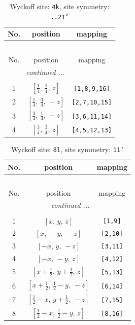 \documentclass[fleqn,8pt]{jsarticle}
\begin{document}
\renewcommand{\arraystretch}{1.2}
\begin{longtable}{ccc}
\caption{Wyckoff site: {\tt 4k}, site symmetry: {\tt ..21'}}
 \\
 \hline \hline
No. & position & mapping \\ \hline \endfirsthead

\multicolumn{2}{l}{\tablename\ \thetable{}} \\
 \hline \hline
No. & position & mapping \\ \hline \endhead

 \hline \hline
\multicolumn{2}{r}{\footnotesize\it continued ...} \\ \endfoot

 \hline \hline
\multicolumn{2}{r}{} \\ \endlastfoot

1 & $\left[ \frac{1}{4},\, \frac{1}{4},\, z \right]$ & {\tt [1,8,9,16]} \\ \hline
2 & $\left[ \frac{1}{4},\, \frac{3}{4},\, - z \right]$ & {\tt [2,7,10,15]} \\ \hline
3 & $\left[ \frac{3}{4},\, \frac{1}{4},\, - z \right]$ & {\tt [3,6,11,14]} \\ \hline
4 & $\left[ \frac{3}{4},\, \frac{3}{4},\, z \right]$ & {\tt [4,5,12,13]} \\
\end{longtable}
\renewcommand{\arraystretch}{1.2}
\begin{longtable}{ccc}
\caption{Wyckoff site: {\tt 8l}, site symmetry: {\tt 11'}}
 \\
 \hline \hline
No. & position & mapping \\ \hline \endfirsthead

\multicolumn{2}{l}{\tablename\ \thetable{}} \\
 \hline \hline
No. & position & mapping \\ \hline \endhead

 \hline \hline
\multicolumn{2}{r}{\footnotesize\it continued ...} \\ \endfoot

 \hline \hline
\multicolumn{2}{r}{} \\ \endlastfoot

1 & $\left[ x,\, y,\, z \right]$ & {\tt [1,9]} \\ \hline
2 & $\left[ x,\, - y,\, - z \right]$ & {\tt [2,10]} \\ \hline
3 & $\left[ - x,\, y,\, - z \right]$ & {\tt [3,11]} \\ \hline
4 & $\left[ - x,\, - y,\, z \right]$ & {\tt [4,12]} \\ \hline
5 & $\left[ x + \frac{1}{2},\, y + \frac{1}{2},\, z \right]$ & {\tt [5,13]} \\ \hline
6 & $\left[ x + \frac{1}{2},\, \frac{1}{2} - y,\, - z \right]$ & {\tt [6,14]} \\ \hline
7 & $\left[ \frac{1}{2} - x,\, y + \frac{1}{2},\, - z \right]$ & {\tt [7,15]} \\ \hline
8 & $\left[ \frac{1}{2} - x,\, \frac{1}{2} - y,\, z \right]$ & {\tt [8,16]} \\
\end{longtable}
\end{document}
